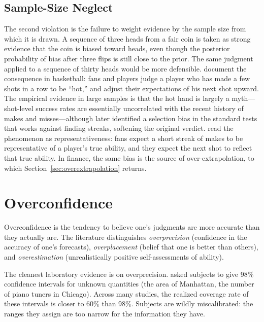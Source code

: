 \subsection{Sample-Size Neglect}

The second violation is the failure to weight evidence by the sample size from which it is drawn. A sequence of three heads from a fair coin is taken as strong evidence that the coin is biased toward heads, even though the posterior probability of bias after three flips is still close to the prior. The same judgment applied to a sequence of thirty heads would be more defensible. \citet{gilovich1985} document the consequence in basketball: fans and players judge a player who has made a few shots in a row to be ``hot,'' and adjust their expectations of his next shot upward. The empirical evidence in large samples is that the hot hand is largely a myth---shot-level success rates are essentially uncorrelated with the recent history of makes and misses---although \citet{millersanjurjo2018} later identified a selection bias in the standard tests that works against finding streaks, softening the original verdict. \citet{gilovich1985} read the phenomenon as representativeness: fans expect a short streak of makes to be representative of a player's true ability, and they expect the next shot to reflect that true ability. In finance, the same bias is the source of over-extrapolation, to which Section~\ref{sec:overextrapolation} returns.

\section{Overconfidence}
\label{sec:overconfidence}

\begin{definition}[Overconfidence]
\label{def:overconf}
Overconfidence is the tendency to believe one's judgments are more accurate than they actually are. The literature distinguishes \emph{overprecision} (confidence in the accuracy of one's forecasts), \emph{overplacement} (belief that one is better than others), and \emph{overestimation} (unrealistically positive self-assessments of ability).
\end{definition}

The cleanest laboratory evidence is on overprecision. \citet{alpert1982} asked subjects to give 98\% confidence intervals for unknown quantities (the area of Manhattan, the number of piano tuners in Chicago). Across many studies, the realized coverage rate of these intervals is closer to 60\% than 98\%. Subjects are wildly miscalibrated: the ranges they assign are too narrow for the information they have.


